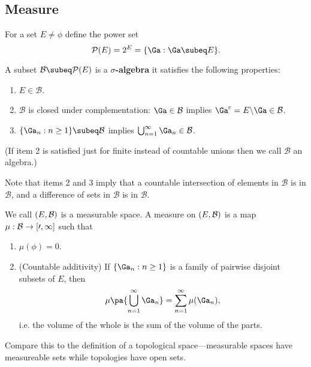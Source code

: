 
\subsection{Measure}

For a set $E\neq \phi$ define the power set
\[\mathcal P(E)=2^E=\{\Ga:\Ga\subeq E\}.\]
\begin{df}\label{salgdf}
A subset $\mathcal B\subeq \mathcal P(E)$ is a $\sigma$\textbf{-algebra} it satisfies the following properties:
\begin{enumerate}
\item $E\in \mathcal B$.
\item $\mathcal B$ is closed under complementation: $\Ga\in \mathcal B$ implies $\Ga^c=E\backslash \Ga\in \cal B$.
\item $\{\Ga_n:n\geq 1\}\subeq \cal B$ implies $\bigcup_{n=1}^{\infty} \Ga_n\in \cal B$.
\end{enumerate}
(If item 2 is satisfied just for finite instead of countable unions then we call $\mathcal B$ an algebra.)
\end{df}
Note that items 2 and 3 imply that a countable intersection of elements in $\mathcal B$ is in $\mathcal B$, and a difference of sets in $\mathcal B$ is in $\mathcal B$.
\begin{df}
We call 
$(E, \cal B)$ is a measurable space. A measure on $(E,\cal B)$ is a map $\mu:\cal B\to [0,\infty]$ such that 
\begin{enumerate}
\item $\mu(\phi)=0$.
\item (Countable additivity) If $\{\Ga_n:n\geq 1\}$ is a family of pairwise disjoint subsets of $E$, then
\[
\mu\pa{\bigcup_{n=1}^{\infty}\Ga_n}=\sum_{n=1}^{\infty} \mu(\Ga_n),
\]
i.e. the volume of the whole is the sum of the volume of the parts.
\end{enumerate}
\end{df}
Compare this to the definition of a  topological space---measurable spaces have measureable sets while topologies have open sets.

